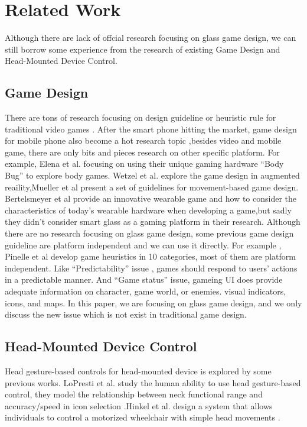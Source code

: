 \section{Related Work}

Although there are lack of offcial research focusing on glass game design, we can still borrow some experience from the research of existing Game Design and Head-Mounted Device Control.

\subsection{Game Design}

There are tons of research focusing on design guideline or heuristic rule for traditional video games \cite{gameflow,criticalreview,chi04game,09game,02game,08game,07game}. After the smart phone hitting the market, game design for mobile phone also become a hot research topic \cite{mobilegame,mobile06,mobile08,icec06},besides video and mobile game, there are only bits and pieces research on other specific platform. For example, Elena et al. focusing on using their unique gaming hardware ``Body Bug'' to explore body games\cite{bodygame}. Wetzel et al. explore the game design in augmented reaility\cite{argame},Mueller et al present a set of guidelines for movement-based game design\cite{movegame}. Bertelsmeyer et al provide an innovative wearable game and how to consider the characteristics of today's wearable hardware when developing a game\cite{wearable},but sadly they didn't consider smart glass as a gaming platform in their research. 
Although there are no research focusing on glass game design, some previous game design guideline are platform independent and we can use it directly. For example , Pinelle et al \cite{videogame} develop game heuristics in 10 categories, most of them are platform independent. Like ``Predictability'' issue , games should respond to users’ actions in a predictable manner. And ``Game status'' issue, gameing UI does provide adequate information on character, game world, or enemies. visual indicators, icons, and maps. In this paper, we are focusing on glass game design, and we only discuss the new issue which is not exist in traditional game design.


\subsection{Head-Mounted Device Control}
Head gesture-based controls for head-mounted device is explored by some previous works. LoPresti et al. study the human ability to use head gesture-based control, they model the relationship between neck functional range and accuracy/speed in icon selection \cite{neck}.Hinkel et al. design a system that allows individuals to control a motorized wheelchair with simple head movements \cite{wheel}.